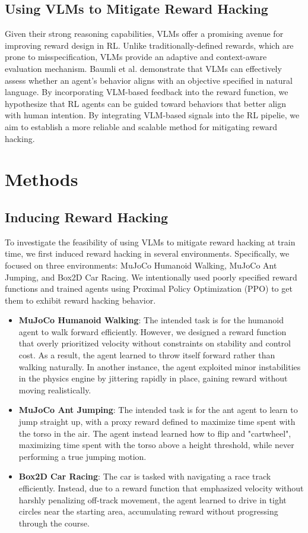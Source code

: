 \documentclass{article}
\begin{document}
\subsection{Using VLMs to Mitigate Reward Hacking}
Given their strong reasoning capabilities, VLMs offer a promising avenue for improving reward design in RL. Unlike traditionally-defined rewards, which are prone to misspecification, VLMs provide an adaptive and context-aware evaluation mechanism. Baumli et al. demonstrate that VLMs can effectively assess whether an agent's behavior aligns with an objective specified in natural language. By incorporating VLM-based feedback into the reward function, we hypothesize that RL agents can be guided toward behaviors that better align with human intention. By integrating VLM-based signals into the RL pipelie, we aim to establish a more reliable and scalable method for mitigating reward hacking.

\section{Methods}
\subsection{Inducing Reward Hacking}
To investigate the feasibility of using VLMs to mitigate reward hacking at train time, we first induced reward hacking in several environments. Specifically, we focused on three environments: MuJoCo Humanoid Walking, MuJoCo Ant Jumping, and Box2D Car Racing. We intentionally used poorly specified reward functions and trained agents using Proximal Policy Optimization (PPO) to get them to exhibit reward hacking behavior.

\begin{itemize}
\item \textbf{MuJoCo Humanoid Walking}: The intended task is for the humanoid agent to walk forward efficiently. However, we designed a reward function that overly prioritized velocity without constraints on stability and control cost. As a result, the agent learned to throw itself forward rather than walking naturally. In another instance, the agent exploited minor instabilities in the physics engine by jittering rapidly in place, gaining reward without moving realistically.

\item \textbf{MuJoCo Ant Jumping}: The intended task is for the ant agent to learn to jump straight up, with a proxy reward defined to maximize time spent with the torso in the air. The agent instead learned how to flip and "cartwheel", maximizing time spent with the torso above a height threshold, while never performing a true jumping motion.

\item \textbf{Box2D Car Racing}: The car is tasked with navigating a race track efficiently. Instead, due to a reward function that emphasized velocity without harshly penalizing off-track movement, the agent learned to drive in tight circles near the starting area, accumulating reward without progressing through the course.
\end{itemize}
\end{document}
